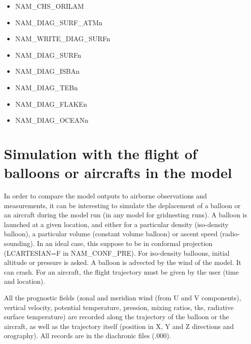 \begin{itemize}
\item NAM\_CHS\_ORILAM
\item NAM\_DIAG\_SURF\_ATMn
\item NAM\_WRITE\_DIAG\_SURFn
\item NAM\_DIAG\_SURFn
\item NAM\_DIAG\_ISBAn
\item NAM\_DIAG\_TEBn
\item NAM\_DIAG\_FLAKEn
\item NAM\_DIAG\_OCEANn
\end{itemize}






\section{Simulation with the flight of balloons or aircrafts in the model}
\label{ss:balloon}

In order to compare the model outputs to airborne observations
and measurements, it can be interesting to simulate the deplacement of a
balloon or an aircraft during the model run (in any model for
gridnesting runs). A balloon is launched at
a given location, and either for a particular density (iso-density balloon),
a particular volume (constant volume balloon)
or ascent speed (radio-sounding). In an ideal case, this suppose to be in conformal projection 
(LCARTESIAN=F in NAM\_CONF\_PRE).
For iso-density balloons, initial 
altitude or pressure is asked. A balloon is advected by the wind of the
model. It can crash. For an aircraft, the flight
trajectory must be given by the user (time and location).

All the prognostic fields (zonal and meridian wind
(from U and V components), vertical velocity, potential temperature, pression,
mixing ratios, tke, radiative surface temperature)
are recorded along the trajectory
of the balloon or the aircraft, as well as the trajectory itself (position in
X, Y and Z directions and orography).
All records are in the diachronic files (.000).

